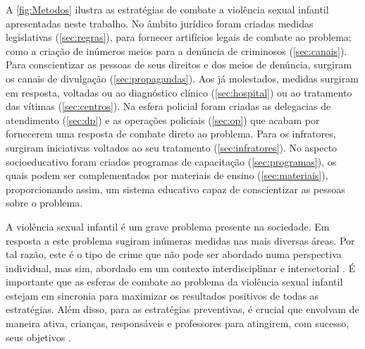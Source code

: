 \newpage



A \autoref{fig:Metodos} ilustra as estratégias de combate a violência sexual infantil apresentadas neste trabalho. No âmbito jurídico foram criadas medidas legislativas (\autoref{sec:regras}), para fornecer artifícios legais de combate ao problema; como a criação de inúmeros meios para a denúncia de criminosos (\autoref{sec:canais}). Para conscientizar as pessoas de seus direitos e dos meios de denúncia, surgiram os canais de divulgação (\autoref{sec:propagandas}). Aos já molestados, medidas surgiram em resposta, voltadas ou ao diagnóstico clínico (\autoref{sec:hospital}) ou ao tratamento das vítimas (\autoref{sec:centros}). Na esfera policial foram criadas as delegacias de atendimento (\autoref{sec:dp}) e as operações policiais (\autoref{sec:op}) que acabam por fornecerem uma resposta de combate direto ao problema. Para os infratores, surgiram iniciativas voltados ao seu tratamento  (\autoref{sec:infratores}). No aspecto socioeducativo foram criados programas de capacitação (\autoref{sec:programas}), os quais podem ser complementados por materiais de ensino (\autoref{sec:materiais}), proporcionando assim, um sistema educativo capaz de conscientizar as pessoas sobre o problema. 



A violência sexual infantil é um grave problema presente na sociedade. Em resposta a este problema sugiram inúmeras medidas nas mais diversas áreas. Por tal razão, este é o tipo de crime que não pode ser abordado numa perspectiva individual, mas sim, abordado em um contexto interdisciplinar e intersetorial \cite{maria2010papel, pinto2017avaliaccao}. %
É importante que as esferas de combate ao problema da violência sexual infantil estejam em sincronia para maximizar os resultados positivos de todas as estratégias. Além disso, para as estratégias preventivas, é crucial que envolvam de maneira ativa, crianças, responsáveis e professores para atingirem, com sucesso, seus objetivos \cite{dip2016advancing}. 





